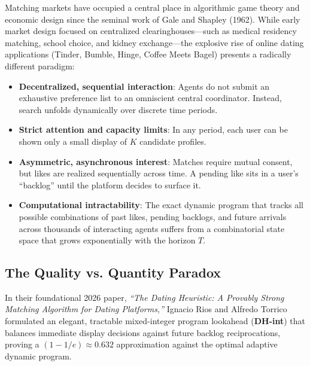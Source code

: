 \documentclass[11pt,letterpaper]{article}
\theoremstyle{definition}
\theoremstyle{plain}
\theoremstyle{remark}
\begin{document}
Matching markets have occupied a central place in algorithmic game theory and economic design since the seminal work of Gale and Shapley (1962). While early market design focused on centralized clearinghouses—such as medical residency matching, school choice, and kidney exchange—the explosive rise of online dating applications (Tinder, Bumble, Hinge, Coffee Meets Bagel) presents a radically different paradigm:
\begin{itemize}[leftmargin=2em]
    \item \textbf{Decentralized, sequential interaction}: Agents do not submit an exhaustive preference list to an omniscient central coordinator. Instead, search unfolds dynamically over discrete time periods.
    \item \textbf{Strict attention and capacity limits}: In any period, each user can be shown only a small display of $K$ candidate profiles.
    \item \textbf{Asymmetric, asynchronous interest}: Matches require mutual consent, but likes are realized sequentially across time. A pending like sits in a user's ``backlog'' until the platform decides to surface it.
    \item \textbf{Computational intractability}: The exact dynamic program that tracks all possible combinations of past likes, pending backlogs, and future arrivals across thousands of interacting agents suffers from a combinatorial state space that grows exponentially with the horizon $T$.
\end{itemize}

\subsection{The Quality vs. Quantity Paradox}
In their foundational 2026 paper, \emph{``The Dating Heuristic: A Provably Strong Matching Algorithm for Dating Platforms,''} Ignacio Rios and Alfredo Torrico formulated an elegant, tractable mixed-integer program lookahead (\textbf{DH-int}) that balances immediate display decisions against future backlog reciprocations, proving a $(1 - 1/e) \approx 0.632$ approximation against the optimal adaptive dynamic program.
\end{document}
